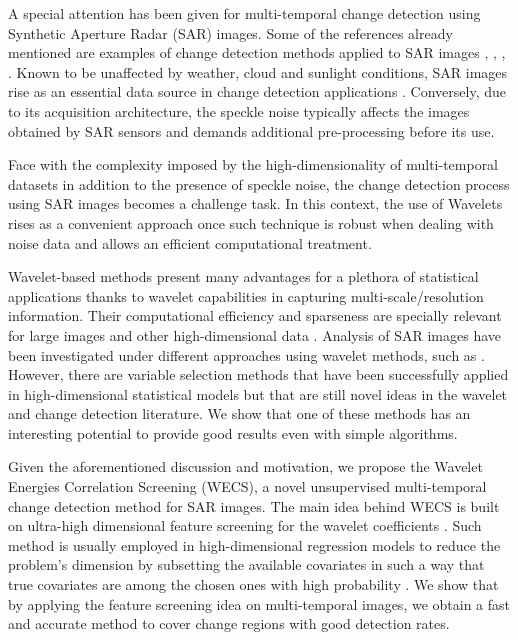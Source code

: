 \documentclass[journal]{IEEEtran}
\begin{document}
A special attention has been given for multi-temporal change detection using Synthetic Aperture Radar (SAR) images. 
Some of the references already mentioned are examples of change detection methods applied to SAR images \cite{barreto2016deforestation,ban2012multitemporal,scher2021mapping,quin2014mimosa}, \cite{jia2018novel}, \cite{hou2014unsupervised}, \cite{bovolo2005detail}. 
Known to be unaffected by weather, cloud and sunlight conditions, SAR images rise as an essential data source in change detection applications \cite{bovolo2005detail}.
Conversely, due to its acquisition architecture, the speckle noise typically affects the images obtained by SAR sensors and demands additional pre-processing before its use.

Face with the complexity imposed by the high-dimensionality of multi-temporal datasets in addition to the presence of speckle noise, the change detection process using SAR images becomes a challenge task.
In this context, the use of Wavelets rises as a convenient approach once such technique is robust when dealing with noise data and allows an efficient computational treatment. 

Wavelet-based methods present many advantages for a plethora of statistical applications \cite{vidakovic1999statistical} thanks to wavelet capabilities in capturing multi-scale/resolution information. 
Their computational efficiency and sparseness are specially relevant for large images and other high-dimensional data \cite{morettin2017wavelets}. 
Analysis of SAR images have been investigated under different approaches using wavelet methods, such as \cite{atto2012multidate,bouhlel2015multivariate,celik2009multiscale,cui2012statistical}. 
However, there are variable selection methods that have been successfully applied in high-dimensional statistical models but that are still novel ideas in the wavelet and change detection literature. We show that one of these methods has an interesting potential to provide good results even with simple algorithms.


Given the aforementioned discussion and motivation, we propose the Wavelet Energies Correlation Screening (WECS), a novel unsupervised multi-temporal change detection method for SAR images.
%
The main idea behind WECS is built on ultra-high dimensional feature screening for the wavelet coefficients \cite{fan2020statistical}. Such method is usually employed in high-dimensional regression models to reduce the problem's dimension by subsetting the available covariates in such a way that true covariates are among the chosen ones with high probability \cite{fan2008sure}. We show that by applying the feature screening idea on multi-temporal images, we obtain a fast and accurate method to cover change regions with good detection rates.
\end{document}
